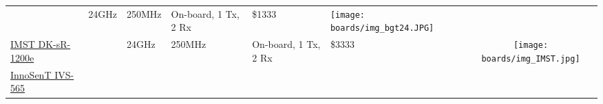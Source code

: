 \begin{longtable}[]{@{}llllllc@{}}
\begin{minipage}[t]{\colwidthB}
\strut\end{minipage} &
\begin{minipage}[t]{\colwidthC}\raggedright\strut
24GHz
\strut\end{minipage} &
\begin{minipage}[t]{\colwidthD}\raggedright\strut
250MHz
\strut\end{minipage} &
\begin{minipage}[t]{\colwidthE}\raggedright\strut
On-board, 1 Tx, 2 Rx
\strut\end{minipage} &
\begin{minipage}[t]{\colwidthF}\raggedright\strut
\$1333
\strut\end{minipage} &
\begin{minipage}[t]{\colwidthG}\centering\strut
\texttt{[image: boards/img\_bgt24.JPG]}
\strut\end{minipage}\tabularnewline

\begin{minipage}[t]{\colwidthA}\raggedright\strut
	\href{http://webshop.imst.de/dk-sr-1200e-development-platform-for-24-ghz-fmcw-radar-application.html
}{IMST DK-sR-1200e}
\strut\end{minipage} &
\begin{minipage}[t]{\colwidthB}\raggedright\strut

\strut\end{minipage} &
\begin{minipage}[t]{\colwidthC}\raggedright\strut
24GHz
\strut\end{minipage} &
\begin{minipage}[t]{\colwidthD}\raggedright\strut
250MHz
\strut\end{minipage} &
\begin{minipage}[t]{\colwidthE}\raggedright\strut
On-board, 1 Tx, 2 Rx
\strut\end{minipage} &
\begin{minipage}[t]{\colwidthF}\raggedright\strut
\$3333
\strut\end{minipage} &
\begin{minipage}[t]{\colwidthG}\centering\strut
\texttt{[image: boards/img\_IMST.jpg]}
\strut\end{minipage}\tabularnewline

\begin{minipage}[t]{\colwidthA}\raggedright\strut
	\href{http://www.innosent.de/fileadmin/media/dokumente/DATASHEETS_2016/Datenblatt_IVS-565.pdf}{InnoSenT IVS-565}
\strut\end{minipage} &
\begin{minipage}[t]{\colwidthB}\raggedright\strut


\end{minipage}
\end{longtable}
